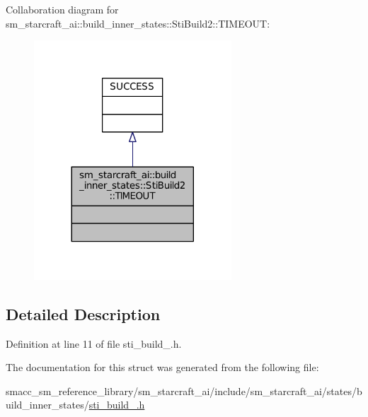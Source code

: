 Collaboration diagram for sm\+\_\+starcraft\+\_\+ai\+:\+:build\+\_\+inner\+\_\+states\+:\+:Sti\+Build2\+:\+:T\+I\+M\+E\+O\+UT\+:
\nopagebreak
\begin{figure}[H]
\begin{center}
\leavevmode
\includegraphics[width=209pt]{structsm__starcraft__ai_1_1build__inner__states_1_1StiBuild2_1_1TIMEOUT__coll__graph}
\end{center}
\end{figure}


\subsection{Detailed Description}


Definition at line 11 of file sti\+\_\+build\+\_.\+h.



The documentation for this struct was generated from the following file\+:\begin{DoxyCompactItemize}
\item 
smacc\+\_\+sm\+\_\+reference\+\_\+library/sm\+\_\+starcraft\+\_\+ai/include/sm\+\_\+starcraft\+\_\+ai/states/build\+\_\+inner\+\_\+states/\hyperlink{sti__build__2_8h}{sti\+\_\+build\+\_.\+h}\end{DoxyCompactItemize}

